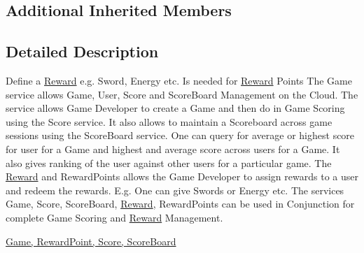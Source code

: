 \subsection*{Additional Inherited Members}


\subsection{Detailed Description}
Define a \hyperlink{classcom_1_1shephertz_1_1app42_1_1paas_1_1sdk_1_1csharp_1_1reward_1_1_reward}{Reward} e.\+g. Sword, Energy etc. Is needed for \hyperlink{classcom_1_1shephertz_1_1app42_1_1paas_1_1sdk_1_1csharp_1_1reward_1_1_reward}{Reward} Points The Game service allows Game, User, Score and Score\+Board Management on the Cloud. The service allows Game Developer to create a Game and then do in Game Scoring using the Score service. It also allows to maintain a Scoreboard across game sessions using the Score\+Board service. One can query for average or highest score for user for a Game and highest and average score across users for a Game. It also gives ranking of the user against other users for a particular game. The \hyperlink{classcom_1_1shephertz_1_1app42_1_1paas_1_1sdk_1_1csharp_1_1reward_1_1_reward}{Reward} and Reward\+Points allows the Game Developer to assign rewards to a user and redeem the rewards. E.\+g. One can give Swords or Energy etc. The services Game, Score, Score\+Board, \hyperlink{classcom_1_1shephertz_1_1app42_1_1paas_1_1sdk_1_1csharp_1_1reward_1_1_reward}{Reward}, Reward\+Points can be used in Conjunction for complete Game Scoring and \hyperlink{classcom_1_1shephertz_1_1app42_1_1paas_1_1sdk_1_1csharp_1_1reward_1_1_reward}{Reward} Management. 

\hyperlink{classcom_1_1shephertz_1_1app42_1_1paas_1_1sdk_1_1csharp_1_1reward_1_1_reward_service}{Game, Reward\+Point, Score, Score\+Board} 

